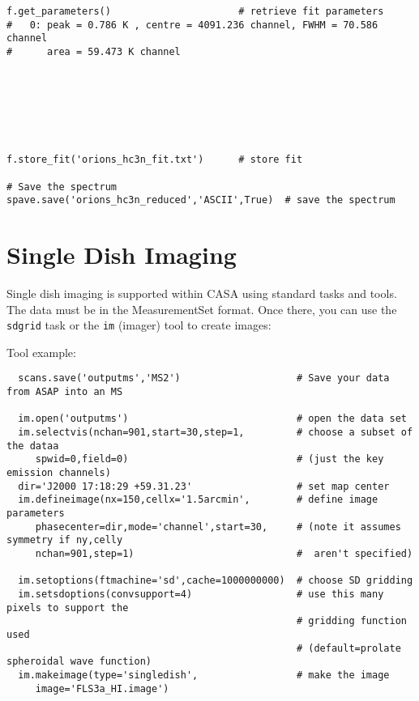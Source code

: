 \small
\begin{verbatim}
f.get_parameters()                      # retrieve fit parameters
#   0: peak = 0.786 K , centre = 4091.236 channel, FWHM = 70.586 channel
#      area = 59.473 K channel
                                                                                        
                                                                                        
                                                                                        
                                                                                        
                                                                                        
                                                                                        

f.store_fit('orions_hc3n_fit.txt')      # store fit                                     

# Save the spectrum
spave.save('orions_hc3n_reduced','ASCII',True)  # save the spectrum                     
\end{verbatim}
\normalsize

\section{Single Dish Imaging}
\label{section:sd.imaging}

Single dish imaging is supported within CASA using standard
tasks and tools. The data must be in the MeasurementSet format. Once
there, you can use the {\tt sdgrid} task or the {\tt im} (imager) tool
to create images:

Tool example:

\small
\begin{verbatim}
  scans.save('outputms','MS2')                    # Save your data from ASAP into an MS

  im.open('outputms')                             # open the data set
  im.selectvis(nchan=901,start=30,step=1,         # choose a subset of the dataa   
     spwid=0,field=0)                             # (just the key emission channels) 
  dir='J2000 17:18:29 +59.31.23'                  # set map center                
  im.defineimage(nx=150,cellx='1.5arcmin',        # define image parameters
     phasecenter=dir,mode='channel',start=30,     # (note it assumes symmetry if ny,celly 
     nchan=901,step=1)                            #  aren't specified)
                                                                       
  im.setoptions(ftmachine='sd',cache=1000000000)  # choose SD gridding                
  im.setsdoptions(convsupport=4)                  # use this many pixels to support the 
                                                  # gridding function used
                                                  # (default=prolate spheroidal wave function)
  im.makeimage(type='singledish',                 # make the image
     image='FLS3a_HI.image') 
\end{verbatim}
\normalsize

